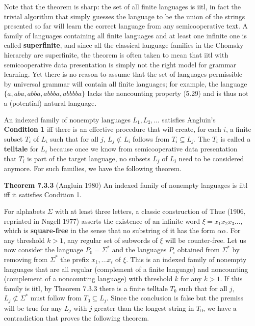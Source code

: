 \smallskip{} Note that the theorem is sharp: the set
of all finite languages is iitl, in fact the trivial algorithm that simply
guesses the language to be the union of the strings presented so far will
learn the correct language from any semicooperative text. A family of
languages containing all finite languages and at least one infinite one is
called {\bf superfinite}, and since all the
classical language families in the Chomsky hierarchy are superfinite, the
theorem is often taken to mean that iitl with semicooperative data
presentation is simply not the right model for grammar learning. Yet there is
no reason to assume that the set of languages permissible by universal grammar
will contain all finite languages; for example, the language
$\{a,aba,abba,abbba,abbbba\}$ lacks the noncounting property (5.29) and is
thus not a (potential) natural language.

An indexed family of nonempty languages $L_1,L_2,\ldots$ satisfies Angluin's
{\bf Condition 1} iff there is an effective procedure that will create, for
each $i$, a finite subset $T_i$ of $L_i$ such that for all $j$, $L_j
\not\subset L_i$ follows from $T_i \subseteq L_j$. The $T_i$ is called a {\bf
  telltale} for $L_i$ because once we know from
semicooperative data presentation that $T_i$ is part of the target language,
no subsets $L_j$ of $L_i$ need to be considered anymore. For such families, we
have the following theorem.

\smallskip\noindent
{\bf Theorem 7.3.3} (Angluin 1980) An indexed family of nonempty languages 
is iitl iff it satisfies Condition 1.\nocite{Angluin:1980}

\smallskip\noindent For alphabets $\Sigma$ with at least three letters, a
classic construction of Thue (1906, reprinted in Nagell
1977)\nocite{Thue:1906}\nocite{Nagell:1977} asserts the existence of an
infinite word $\xi = x_1x_2x_3\ldots$, which is {\bf square-free} in the sense
that no substring of it has the form $\alpha\alpha$. For any threshold $k>1$, any regular set of subwords of $\xi$
will be counter-free.  Let us now consider the language $P_0=\Sigma^*$ and the
languages $P_i$ obtained from $\Sigma^*$ by removing from $\Sigma^*$ the
prefix $x_1,\ldots x_i$ of $\xi$. This is an indexed family of nonempty
languages that are all regular (complement of a finite language) and
noncounting (complement of a noncounting language) with threshold $k$ for any
$k>1$. If this family is iitl, by Theorem 7.3.3 there is a finite telltale
$T_0$ such that for all $j$, $L_j \not\subset \Sigma^*$ must follow from $T_0
\subseteq L_j$. Since the conclusion is false but the premiss will be true for
any $L_j$ with $j$ greater than the longest string in $T_0$, we have a
contradiction that proves the following theorem.

